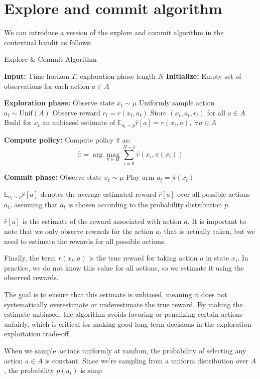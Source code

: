 \newpage

\section{Explore and commit algorithm}

We can introduce a version of the explore and commit algorithm in the contextual bandit as follows:

\begin{algorithm}
    \caption{Explore \& Commit Algorithm}
    \begin{algorithmic}[1]
        \State \textbf{Input:} Time horizon $T$, exploration phase length $N$
        \State \textbf{Initialize:} Empty set of observations for each action $a \in A$

        \State \textbf{Exploration phase:}
        \State Observe state $x_t \sim \mu$
        \State Uniformly sample action $a_t \sim \text{Unif}(A)$
        \State Observe reward $r_t = r(x_t, a_t)$
        \State Store $(x_t, a_t, r_t)$ for all $a \in A$
        \State Build for $x_t$ an unbiased estimate of $\mathbb{E}_{a_t \sim p} \hat{r}[a] = r(x_t, a), \ \forall a \in A$
        \EndFor

        \State \textbf{Compute policy:}
        \State Compute policy $\hat{\pi}$ as:
        \[
            \hat{\pi} = \arg \max_{\pi \in \Pi} \sum_{i=0}^{N-1} \hat{r}(x_i, \pi(x_i))
        \]

        \State \textbf{Commit phase:}
        \State Observe state $x_t \sim \mu$
        \State Play arm $a_t = \hat{\pi}(x_t)$
        \EndFor
    \end{algorithmic}
\end{algorithm}


\begin{tipbox}[Explanation]
    $\mathbb{E}_{a_t \sim p} \hat{r}[a] $ denotes the average estimated reward $\hat{r}[a]$ over all possible actions $a_t$, assuming that $a_t$ is chosen according to the probability distribution $p$.

    $\hat{r}[a]$ is the estimate of the reward associated with action $a$. It is important to note that we only observe rewards for the action $a_t$ that is actually taken, but we need to estimate the rewards for all possible actions.

    Finally, the term $r(x_t, a)$ is the true reward for taking action $a$ in state $x_t$. In practice, we do not know this value for all actions, so we estimate it using the observed rewards.

    The goal is to ensure that this estimate is unbiased, meaning it does not systematically overestimate or underestimate the true reward. By making the estimate unbiased, the algorithm avoids favoring or penalizing certain actions unfairly, which is critical for making good long-term decisions in the exploration-exploitation trade-off.

\end{tipbox}

When we sample actions uniformly at random, the probability of selecting any action $a \in A$ is constant. Since we're sampling from a uniform distribution over $A$, the probability $p(a_t)$ is simp